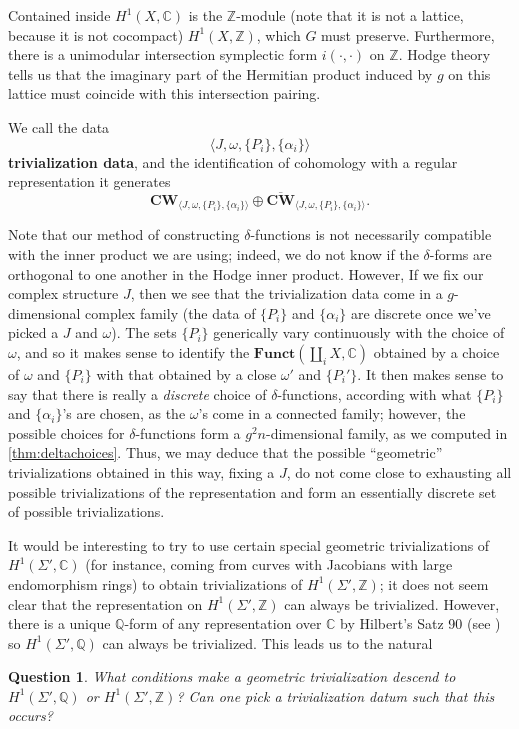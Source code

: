\documentclass[11pt]{amsart}
\newtheorem{quest}[thm]{Question}
\numberwithin{thm}{section}
\begin{document}
Contained inside $H^1(X, \mathbb{C})$ is the $\mathbb{Z}$-module (note that it is not a lattice, because it is not cocompact) $H^1(X, \mathbb{Z})$, which $G$ must preserve.  Furthermore, there is a unimodular intersection symplectic form $i(\cdot, \cdot)$ on $\mathbb{Z}$.  Hodge theory tells us that the imaginary part of the Hermitian product induced by $g$ on this lattice must coincide with this intersection pairing.

We call the data \[\langle J, \omega, \{P_i\}, \{\alpha_i\}\rangle\] \textbf{trivialization data}, and the identification of cohomology with a regular representation it generates \[\mathbf{CW}_{\langle J, \omega, \{P_i\}, \{\alpha_i\}\rangle} \oplus \overline{\mathbf{CW}}_{\langle J, \omega, \{P_i\}, \{\alpha_i\}\rangle}.\]

Note that our method of constructing $\delta$-functions is not necessarily compatible with the inner product we are using; indeed, we do not know if the $\delta$-forms are orthogonal to one another in the Hodge inner product.  However, If we fix our complex structure $J$, then we see that the trivialization data come in a $g$-dimensional complex family (the data of $\{P_i\}$ and $\{\alpha_i\}$ are discrete once we've picked a $J$ and $\omega$).  The sets $\{P_i\}$ generically vary continuously with the choice of $\omega$, and so it makes sense to identify the ${\mathbf{Funct}}(\coprod_i X, \mathbb{C})$ obtained by a choice of $\omega$ and $\{P_i\}$ with that obtained by a close $\omega'$ and $\{P_i'\}$.  It then makes sense to say that there is really a \textit{discrete} choice of $\delta$-functions, according with what $\{P_i\}$ and $\{\alpha_i\}$'s are chosen, as the $\omega$'s come in a connected family; however, the possible choices for $\delta$-functions form a $g^2n$-dimensional family, as we computed in \ref{thm:deltachoices}.  Thus, we may deduce that the possible ``geometric'' trivializations obtained in this way, fixing a $J$, do not come close to exhausting all possible trivializations of the representation and form an essentially discrete set of possible trivializations.

It would be interesting to try to use certain special geometric trivializations of $H^1(\Sigma', \mathbb{C})$ (for instance, coming from curves with Jacobians with large endomorphism rings) to obtain trivializations of $H^1(\Sigma', \mathbb{Z})$; it does not seem clear that the representation on $H^1(\Sigma', \mathbb{Z})$ can always be trivialized.  However, there is a unique $\mathbb{Q}$-form of any representation over $\mathbb{C}$ by Hilbert's Satz 90 (see \cite{G}) so $H^1(\Sigma', \mathbb{Q})$ can always be trivialized.  This leads us to the natural
\begin{quest}
What conditions make a geometric trivialization descend to $H^1(\Sigma', \mathbb{Q})$ or $H^1(\Sigma', \mathbb{Z})$?  Can one pick a trivialization datum such that this occurs?
\end{quest}
\end{document}
